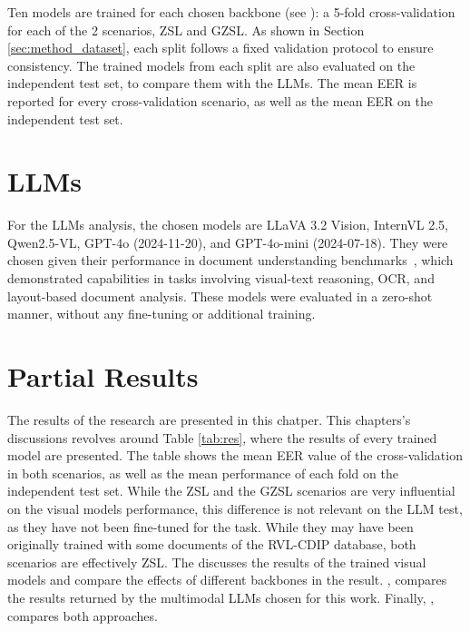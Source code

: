Ten models are trained for each chosen backbone (see ): a 5-fold cross-validation for each of the 2 scenarios, \gls{ZSL} and \gls{GZSL}. As shown in Section \ref{sec:method_dataset}, each split follows a fixed validation protocol to ensure consistency. The trained models from each split are also evaluated on the independent test set, to compare them with the \gls{LLM}s. The mean \gls{EER} is reported for every cross-validation scenario, as well as the mean \gls{EER} on the independent test set.

\section{LLMs}

For the \glspl{LLM} analysis, the chosen models are LLaVA 3.2 Vision, InternVL 2.5, Qwen2.5-VL, GPT-4o (2024-11-20), and GPT-4o-mini (2024-07-18). They were chosen given their performance in document understanding benchmarks~\cite{bai2025qwen2,meta2024llama3.2}, which  demonstrated capabilities in tasks involving visual-text reasoning, OCR, and layout-based document analysis. These models were evaluated in a zero-shot manner, without any fine-tuning or additional training.

\section{Partial Results}
\label{sec:results}

The results of the research are presented in this chatper. This chapters's discussions revolves around Table \ref{tab:res}, where the results of every trained model are presented. The table shows the mean EER value of the cross-validation in both scenarios, as well as the mean performance of each fold on the independent test set. While the \gls{ZSL} and the \gls{GZSL} scenarios are very influential on the visual models performance, this difference is not relevant on the \gls{LLM} test, as they have not been fine-tuned for the task. While they may have been originally trained with some documents of the RVL-CDIP database, both scenarios are effectively \gls{ZSL}. The  discusses the results of the trained visual models and compare the effects of different backbones in the result. , compares the results returned by the multimodal \glspl{LLM} chosen for this work. Finally, , compares both approaches.

